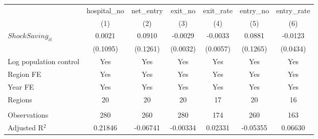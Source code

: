 \begingroup
\centering
\begin{tabular}{lcccccc}
   \toprule
                          & hospital\_no  & net\_entry  & exit\_no  & exit\_rate  & entry\_no  & entry\_rate \\    
                          & (1)           & (2)         & (3)       & (4)         & (5)        & (6)\\  
   \midrule 
   $ShockSaving_{it}$     & 0.0021        & 0.0910      & -0.0029   & -0.0033     & 0.0881     & -0.0123\\   
                          & (0.1095)      & (0.1261)    & (0.0032)  & (0.0057)    & (0.1265)   & (0.0434)\\   
   Log population control & Yes           & Yes         & Yes       & Yes         & Yes        & Yes\\  
   Region FE              & Yes           & Yes         & Yes       & Yes         & Yes        & Yes\\  
   Year FE                & Yes           & Yes         & Yes       & Yes         & Yes        & Yes\\  
   Regions                & 20            & 20          & 20        & 17          & 20         & 16\\  
    \\
   Observations           & 280           & 260         & 280       & 174         & 260        & 163\\  
   Adjusted R$^2$         & 0.21846       & -0.06741    & -0.00334  & 0.02331     & -0.05355   & 0.06630\\  
   \bottomrule
\end{tabular}
\par\endgroup
